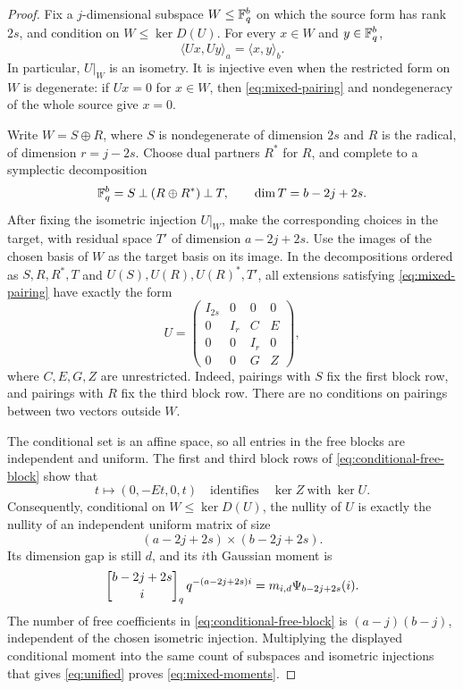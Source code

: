 \begin{proof}
Fix a $j$-dimensional subspace $W\le\mathbb F_q^b$ on which the source form has rank
$2s$, and condition on $W\le\ker D(U)$. For every $x\in W$ and $y\in\mathbb F_q^b$,
\begin{equation}\label{eq:mixed-pairing}
 \langle Ux,Uy\rangle_a=\langle x,y\rangle_b.
\end{equation}
In particular, $U|_W$ is an isometry. It is injective even when the
restricted form on $W$ is degenerate: if $Ux=0$ for $x\in W$, then
\eqref{eq:mixed-pairing} and nondegeneracy of the whole source give $x=0$.

Write $W=S\oplus R$, where $S$ is nondegenerate of dimension $2s$ and $R$
is the radical, of dimension $r=j-2s$. Choose dual partners $R^*$ for $R$,
and complete to a symplectic decomposition
\[
 \mathbb F_q^b=S\mathbin{\perp}(R\oplus R^*)\mathbin{\perp}T,
 \qquad \dim T=b-2j+2s.
\]
After fixing the isometric injection $U|_W$, make the corresponding choices
in the target, with residual space $T'$ of dimension $a-2j+2s$.
Use the images of the chosen basis of $W$ as the target basis on its image.
In the decompositions ordered as $S,R,R^*,T$ and $U(S),U(R),U(R)^*,T'$, all
extensions satisfying \eqref{eq:mixed-pairing} have exactly the form
\begin{equation}\label{eq:conditional-free-block}
 U=
 \begin{pmatrix}
 I_{2s}&0&0&0\\
 0&I_r&C&E\\
 0&0&I_r&0\\
 0&0&G&Z
 \end{pmatrix},
\end{equation}
where $C,E,G,Z$ are unrestricted. Indeed, pairings with $S$ fix the first
block row, and pairings with $R$ fix the third block row. There are no
conditions on pairings between two vectors outside $W$.

The conditional set is an affine space, so all entries in the free blocks
are independent and uniform. The first and third block rows of
\eqref{eq:conditional-free-block} show that
\[
 t\longmapsto(0,-Et,0,t)
 \quad\text{identifies}\quad \ker Z\ \text{with}\ \ker U.
\]
Consequently, conditional on $W\le\ker D(U)$, the nullity of $U$ is
exactly the nullity of an independent uniform matrix of size
\[
 (a-2j+2s)\times(b-2j+2s).
\]
Its dimension gap is still $d$, and its $i$th Gaussian moment is
\[
 \qbin{b-2j+2s}{i}\,q^{-(a-2j+2s)i}
 =m_{i,d}\Psi_{b-2j+2s}(i).
\]
The number of free coefficients in \eqref{eq:conditional-free-block} is
$(a-j)(b-j)$, independent of the chosen isometric injection. Multiplying
the displayed conditional moment into the same count of subspaces and
isometric injections that gives \eqref{eq:unified} proves
\eqref{eq:mixed-moments}.
\end{proof}

